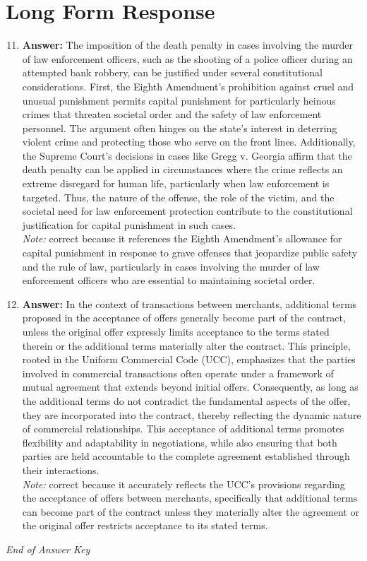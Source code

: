 \documentclass[12pt]{article}
\begin{document}
\section*{Long Form Response}
\begin{enumerate}[label=\arabic*.]
\setcounter{enumi}{10}
\item \textbf{Answer:} The imposition of the death penalty in cases involving the murder of law enforcement officers, such as the shooting of a police officer during an attempted bank robbery, can be justified under several constitutional considerations. First, the Eighth Amendment's prohibition against cruel and unusual punishment permits capital punishment for particularly heinous crimes that threaten societal order and the safety of law enforcement personnel. The argument often hinges on the state's interest in deterring violent crime and protecting those who serve on the front lines. Additionally, the Supreme Court's decisions in cases like Gregg v. Georgia affirm that the death penalty can be applied in circumstances where the crime reflects an extreme disregard for human life, particularly when law enforcement is targeted. Thus, the nature of the offense, the role of the victim, and the societal need for law enforcement protection contribute to the constitutional justification for capital punishment in such cases.
\\ \textit{Note:} correct because it references the Eighth Amendment's allowance for capital punishment in response to grave offenses that jeopardize public safety and the rule of law, particularly in cases involving the murder of law enforcement officers who are essential to maintaining societal order.
\item \textbf{Answer:} In the context of transactions between merchants, additional terms proposed in the acceptance of offers generally become part of the contract, unless the original offer expressly limits acceptance to the terms stated therein or the additional terms materially alter the contract. This principle, rooted in the Uniform Commercial Code (UCC), emphasizes that the parties involved in commercial transactions often operate under a framework of mutual agreement that extends beyond initial offers. Consequently, as long as the additional terms do not contradict the fundamental aspects of the offer, they are incorporated into the contract, thereby reflecting the dynamic nature of commercial relationships. This acceptance of additional terms promotes flexibility and adaptability in negotiations, while also ensuring that both parties are held accountable to the complete agreement established through their interactions.
\\ \textit{Note:} correct because it accurately reflects the UCC's provisions regarding the acceptance of offers between merchants, specifically that additional terms can become part of the contract unless they materially alter the agreement or the original offer restricts acceptance to its stated terms.
\end{enumerate}

\vfill
\noindent\textit{End of Answer Key}
\end{document}
